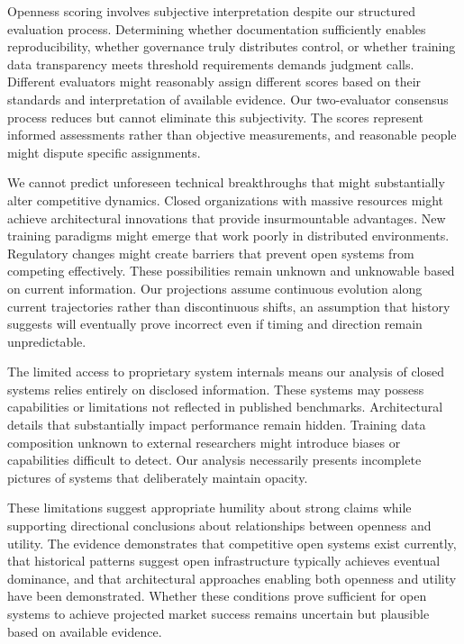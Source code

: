 Openness scoring involves subjective interpretation despite our structured evaluation process. Determining whether documentation sufficiently enables reproducibility, whether governance truly distributes control, or whether training data transparency meets threshold requirements demands judgment calls. Different evaluators might reasonably assign different scores based on their standards and interpretation of available evidence. Our two-evaluator consensus process reduces but cannot eliminate this subjectivity. The scores represent informed assessments rather than objective measurements, and reasonable people might dispute specific assignments.

We cannot predict unforeseen technical breakthroughs that might substantially alter competitive dynamics. Closed organizations with massive resources might achieve architectural innovations that provide insurmountable advantages. New training paradigms might emerge that work poorly in distributed environments. Regulatory changes might create barriers that prevent open systems from competing effectively. These possibilities remain unknown and unknowable based on current information. Our projections assume continuous evolution along current trajectories rather than discontinuous shifts, an assumption that history suggests will eventually prove incorrect even if timing and direction remain unpredictable.

The limited access to proprietary system internals means our analysis of closed systems relies entirely on disclosed information. These systems may possess capabilities or limitations not reflected in published benchmarks. Architectural details that substantially impact performance remain hidden. Training data composition unknown to external researchers might introduce biases or capabilities difficult to detect. Our analysis necessarily presents incomplete pictures of systems that deliberately maintain opacity.

These limitations suggest appropriate humility about strong claims while supporting directional conclusions about relationships between openness and utility. The evidence demonstrates that competitive open systems exist currently, that historical patterns suggest open infrastructure typically achieves eventual dominance, and that architectural approaches enabling both openness and utility have been demonstrated. Whether these conditions prove sufficient for open systems to achieve projected market success remains uncertain but plausible based on available evidence.

